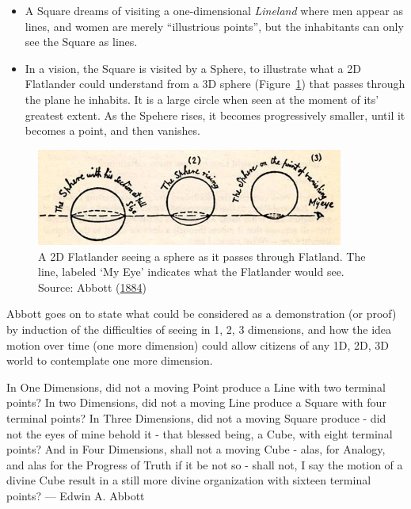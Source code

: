\documentclass[
  letterpaper,
  10pt,
  krantz2]{krantz}
\renewenvironment{quote}{\begin{VF}}{\end{VF}}
\begin{document}
\begin{itemize}
\item
  A Square dreams of visiting a one-dimensional \emph{Lineland} where
  men appear as lines, and women are merely ``illustrious points'', but
  the inhabitants can only see the Square as lines.
\item
  In a vision, the Square is visited by a Sphere, to illustrate what a
  2D Flatlander could understand from a 3D sphere
  (Figure~\ref{fig-flatland-spheres}) that passes through the plane he
  inhabits. It is a large circle when seen at the moment of its'
  greatest extent. As the Spehere rises, it becomes progressively
  smaller, until it becomes a point, and then vanishes.
\end{itemize}

\begin{figure}

{\centering \includegraphics[width=0.9\textwidth,height=\textheight]{images/flatland-spheres.jpg}

}

\caption{\label{fig-flatland-spheres}A 2D Flatlander seeing a sphere as
it passes through Flatland. The line, labeled `My Eye' indicates what
the Flatlander would see. Source: Abbott
(\protect\hyperlink{ref-Abbott:1884}{1884})}

\end{figure}

Abbott goes on to state what could be considered as a demonstration (or
proof) by induction of the difficulties of seeing in 1, 2, 3 dimensions,
and how the idea motion over time (one more dimension) could allow
citizens of any 1D, 2D, 3D world to contemplate one more dimension.

\begin{quote}
In One Dimensions, did not a moving Point produce a Line with two
terminal points? In two Dimensions, did not a moving Line produce a
Square with four terminal points? In Three Dimensions, did not a moving
Square produce - did not the eyes of mine behold it - that blessed
being, a Cube, with eight terminal points? And in Four Dimensions, shall
not a moving Cube - alas, for Analogy, and alas for the Progress of
Truth if it be not so - shall not, I say the motion of a divine Cube
result in a still more divine organization with sixteen terminal points?
--- Edwin A. Abbott
\end{quote}
\end{document}
